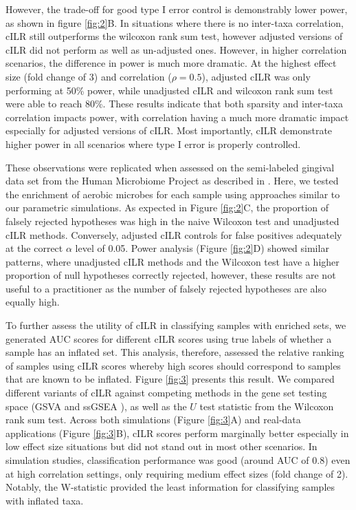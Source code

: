 \documentclass{article}
\begin{document}
However, the trade-off for good type I error control is demonstrably lower power, as shown in figure \ref{fig:2}B. In situations where there is no inter-taxa correlation, cILR still outperforms the wilcoxon rank sum test, however adjusted versions of cILR did not perform as well as un-adjusted ones. However, in higher correlation scenarios, the difference in power is much more dramatic. At the highest effect size (fold change of 3) and correlation ($\rho = 0.5$), adjusted cILR was only performing at 50\% power, while unadjusted cILR and wilcoxon rank sum test were able to reach 80\%. These results indicate that both sparsity and inter-taxa correlation impacts power, with correlation having a much more dramatic impact especially for adjusted versions of cILR. Most importantly, cILR demonstrate higher power in all scenarios where type I error is properly controlled.    

These observations were replicated when assessed on the semi-labeled gingival data set from the Human Microbiome Project as described in . Here, we tested the enrichment of aerobic microbes for each sample using approaches similar to our parametric simulations. As expected in Figure \ref{fig:2}C, the proportion of falsely rejected hypotheses was high in the naive Wilcoxon test and unadjusted cILR methods. Conversely, adjusted cILR controls for false positives adequately at the correct $\alpha$ level of 0.05. Power analysis (Figure \ref{fig:2}D) showed similar patterns, where unadjusted cILR methods and the Wilcoxon test have a higher proportion of null hypotheses correctly rejected, however, these results are not useful to a practitioner as the number of falsely rejected hypotheses are also equally high.  

To further assess the utility of cILR in classifying samples with enriched sets, we generated AUC scores for different cILR scores using true labels of whether a sample has an inflated set. This analysis, therefore, assessed the relative ranking of samples using cILR scores whereby high scores should correspond to samples that are known to be inflated. Figure \ref{fig:3} presents this result. We compared different variants of cILR against competing methods in the gene set testing space (GSVA \cite{hanzelmann2013} and ssGSEA \cite{barbie2009}), as well as the $U$ test statistic from the Wilcoxon rank sum test. Across both simulations (Figure \ref{fig:3}A) and real-data applications (Figure \ref{fig:3}B), cILR scores perform marginally better especially in low effect size situations but did not stand out in most other scenarios. In simulation studies, classification performance was good (around AUC of 0.8) even at high correlation settings, only requiring medium effect sizes (fold change of 2). Notably, the W-statistic provided the least information for classifying samples with inflated taxa.
\end{document}
